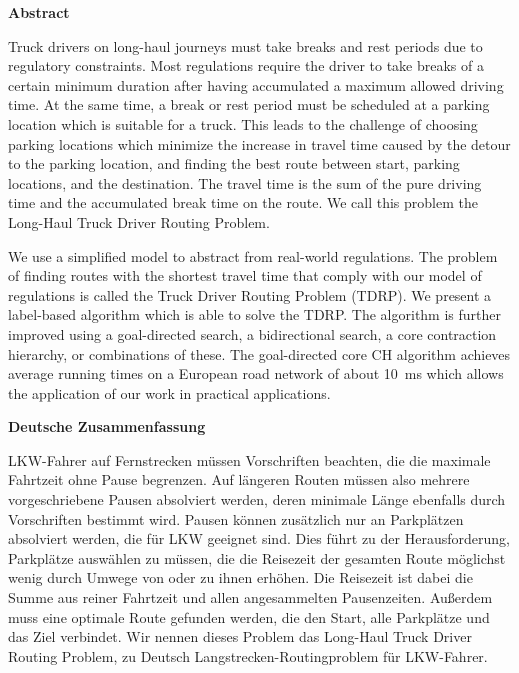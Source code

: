 \documentclass{thesisclass}
\begin{document}
\begin{addmargin}{0.5cm}
	\centerline{\textbf{Abstract}}

	Truck drivers on long-haul journeys must take breaks and rest periods due to regulatory constraints. Most regulations require the driver to take breaks of a certain minimum duration after having accumulated a maximum allowed driving time. At the same time, a break or rest period must be scheduled at a parking location which is suitable for a truck. This leads to the challenge of choosing parking locations which minimize the increase in travel time caused by the detour to the parking location, and finding the best route between start, parking locations, and the destination. The travel time is the sum of the pure driving time and the accumulated break time on the route. We call this problem the Long-Haul Truck Driver Routing Problem.

	We use a simplified model to abstract from real-world regulations. The problem of finding routes with the shortest travel time that comply with our model of regulations is called the Truck Driver Routing Problem (TDRP). We present a label-based algorithm which is able to solve the TDRP. The algorithm is further improved using a goal-directed search, a bidirectional search, a core contraction hierarchy, or combinations of these. The goal-directed core CH algorithm achieves average running times on a European road network of about \SI{10}{\milli\second} which allows the application of our work in practical applications.

	\vskip 2cm

	\centerline{\textbf{Deutsche Zusammenfassung}}
	LKW-Fahrer auf Fernstrecken müssen Vorschriften beachten, die die maximale Fahrtzeit ohne Pause begrenzen. Auf längeren Routen müssen also mehrere vorgeschriebene Pausen absolviert werden, deren minimale Länge ebenfalls durch Vorschriften bestimmt wird. Pausen können zusätzlich nur an Parkplätzen absolviert werden, die für LKW geeignet sind. Dies führt zu der Herausforderung, Parkplätze auswählen zu müssen, die die Reisezeit der gesamten Route möglichst wenig durch Umwege von oder zu ihnen erhöhen. Die Reisezeit ist dabei die Summe aus reiner Fahrtzeit und allen angesammelten Pausenzeiten. Außerdem muss eine optimale Route gefunden werden, die den Start, alle Parkplätze und das Ziel verbindet. Wir nennen dieses Problem das \glqq Long-Haul Truck Driver Routing Problem\grqq, zu Deutsch \glqq Langstrecken-Routingproblem für LKW-Fahrer\grqq.


\end{addmargin}
\end{document}
